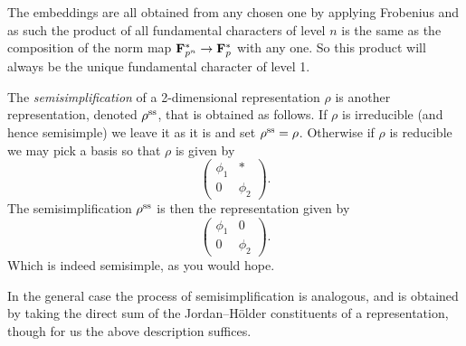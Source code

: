 \documentclass[a4paper,12pt]{article}
\begin{document}
\begin{rmk}\label{rmk:prodchar}
The embeddings are all obtained from any chosen one by applying Frobenius and as such the product of all fundamental characters of level $n$ is the same as the composition of the norm map $\mathbf{F}_{p^n}^* \to \mathbf{F}_p^*$ with any one.
So this product will always be the unique fundamental character of level 1.
\end{rmk}


\begin{defn}\label{def:semisimp}
The \emph{semisimplification} of a 2-dimensional representation $\rho$ is another representation, denoted $\rho^\text{ss}$, that is obtained as follows.
If $\rho$ is irreducible (and hence semisimple) we leave it as it is and set $\rho^\text{ss} = \rho$.
Otherwise if $\rho$ is reducible we may pick a basis so that $\rho$ is given by
\[
\begin{pmatrix}
\phi_1 & * \\
0      & \phi_2
\end{pmatrix}.
\]
The semisimplification $\rho^\text{ss}$ is then the representation given by
\[
\begin{pmatrix}
\phi_1 & 0 \\
0      & \phi_2
\end{pmatrix}.
\]
Which is indeed semisimple, as you would hope.

In the general case the process of semisimplification is analogous, and is obtained by taking the direct sum of the Jordan--H\"older constituents of a representation, though for us the above description suffices.
\end{defn}

\end{document}
